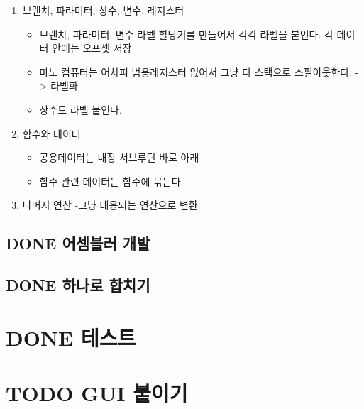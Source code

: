 \documentclass[11pt]{article}
\begin{document}
\begin{enumerate}
\item 브랜치, 파라미터, 상수, 변수, 레지스터
\begin{itemize}
\item 브랜치, 파라미터, 변수 라벨 할당기를 만들어서 각각 라벨을 붙인다. 각 데이터 안에는 오프셋 저장
\item 마노 컴퓨터는 어차피 범용레지스터 없어서 그냥 다 스택으로 스필아웃한다. -> 라벨화
\item 상수도 라벨 붙인다.
\end{itemize}
\item 함수와 데이터
\begin{itemize}
\item 공용데이터는 내장 서브루틴 바로 아래
\item 함수 관련 데이터는 함수에 묶는다.
\end{itemize}
\item 나머지 연산
-그냥 대응되는 연산으로 변환
\end{enumerate}
\subsection{{\bfseries\sffamily DONE} 어셈블러 개발}
\label{sec:org82e0c47}

\subsection{{\bfseries\sffamily DONE} 하나로 합치기}
\label{sec:org87a0568}
\section{{\bfseries\sffamily DONE} 테스트}
\label{sec:org03b9ed2}


\section{{\bfseries\sffamily TODO} GUI 붙이기}
\label{sec:orga1c5b80}
\end{document}
